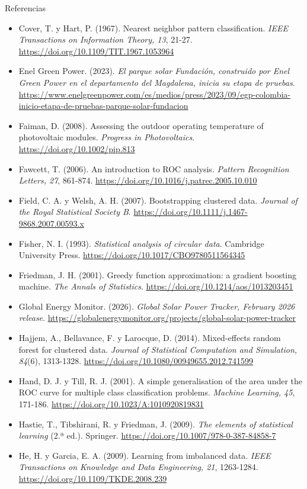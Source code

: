 \documentclass[aspectratio=169,10pt]{beamer}
\begin{document}
\begin{frame}[allowframebreaks]{Referencias}
\begin{itemize}
    \item Cover, T. y Hart, P. (1967). Nearest neighbor pattern classification. \textit{IEEE Transactions on Information Theory, 13}, 21-27. \url{https://doi.org/10.1109/TIT.1967.1053964}
    \item Enel Green Power. (2023). \textit{El parque solar Fundación, construido por Enel Green Power en el departamento del Magdalena, inicia su etapa de pruebas}. \url{https://www.enelgreenpower.com/es/medios/press/2023/09/egp-colombia-inicio-etapa-de-pruebas-parque-solar-fundacion}
    \item Faiman, D. (2008). Assessing the outdoor operating temperature of photovoltaic modules. \textit{Progress in Photovoltaics}. \url{https://doi.org/10.1002/pip.813}
    \item Fawcett, T. (2006). An introduction to ROC analysis. \textit{Pattern Recognition Letters, 27}, 861-874. \url{https://doi.org/10.1016/j.patrec.2005.10.010}
    \item Field, C. A. y Welsh, A. H. (2007). Bootstrapping clustered data. \textit{Journal of the Royal Statistical Society B}. \url{https://doi.org/10.1111/j.1467-9868.2007.00593.x}
    \item Fisher, N. I. (1993). \textit{Statistical analysis of circular data}. Cambridge University Press. \url{https://doi.org/10.1017/CBO9780511564345}
    \item Friedman, J. H. (2001). Greedy function approximation: a gradient boosting machine. \textit{The Annals of Statistics}. \url{https://doi.org/10.1214/aos/1013203451}
    \item Global Energy Monitor. (2026). \textit{Global Solar Power Tracker, February 2026 release}. \url{https://globalenergymonitor.org/projects/global-solar-power-tracker}
    \item Hajjem, A., Bellavance, F. y Larocque, D. (2014). Mixed-effects random forest for clustered data. \textit{Journal of Statistical Computation and Simulation, 84}(6), 1313-1328. \url{https://doi.org/10.1080/00949655.2012.741599}
    \item Hand, D. J. y Till, R. J. (2001). A simple generalisation of the area under the ROC curve for multiple class classification problems. \textit{Machine Learning, 45}, 171-186. \url{https://doi.org/10.1023/A:1010920819831}
    \item Hastie, T., Tibshirani, R. y Friedman, J. (2009). \textit{The elements of statistical learning} (2.ª ed.). Springer. \url{https://doi.org/10.1007/978-0-387-84858-7}
    \item He, H. y Garcia, E. A. (2009). Learning from imbalanced data. \textit{IEEE Transactions on Knowledge and Data Engineering, 21}, 1263-1284. \url{https://doi.org/10.1109/TKDE.2008.239}

\end{itemize}
\end{frame}
\end{document}
